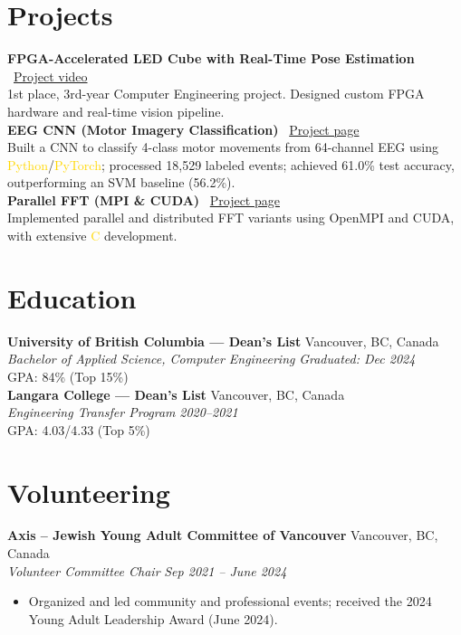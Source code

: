 \documentclass[11pt]{article}
\newcommand{\gold}[1]{\textcolor{gold}{#1}}
\newcommand{\resumeItem}[1]{\item\small{#1}}
\newcommand{\resumeSubheading}[4]{%
  \textbf{#1} \hfill #2\\
  \textit{#3} \hfill \textit{#4}\\
}
\begin{document}
\section{Projects}
\textbf{FPGA-Accelerated LED Cube with Real-Time Pose Estimation} \textbar\ \href{https://www.youtube.com/watch?v=kbrSmiwQhu4&ab_channel=AdinMauer}{Project video}\\
1st place, 3rd-year Computer Engineering project. Designed custom FPGA hardware and real-time vision pipeline.\\
\textbf{EEG CNN (Motor Imagery Classification)} \textbar\ \href{https://mauer4.github.io/project/eeg_cnn/}{Project page}\\
Built a CNN to classify 4-class motor movements from 64-channel EEG using \gold{Python}/\gold{PyTorch}; processed 18,529 labeled events; achieved 61.0\% test accuracy, outperforming an SVM baseline (56.2\%).\\
\textbf{Parallel FFT (MPI \& CUDA)} \textbar\ \href{https://mauer4.github.io/project/parallel_fft/}{Project page}\\
Implemented parallel and distributed FFT variants using OpenMPI and CUDA, with extensive \gold{C} development.

\section{Education}
\resumeSubheading{University of British Columbia --- Dean's List}{Vancouver, BC, Canada}{Bachelor of Applied Science, Computer Engineering}{Graduated: Dec 2024}
GPA: 84\% (Top 15\%)\\
\resumeSubheading{Langara College --- Dean's List}{Vancouver, BC, Canada}{Engineering Transfer Program}{2020--2021}
GPA: 4.03/4.33 (Top 5\%)

\section{Volunteering}
\resumeSubheading{Axis -- Jewish Young Adult Committee of Vancouver}{Vancouver, BC, Canada}{Volunteer Committee Chair}{Sep 2021 -- June 2024}
\vspace{-6pt}
\begin{itemize}[leftmargin=*]
  \resumeItem{Organized and led community and professional events; received the 2024 Young Adult Leadership Award (June 2024).}
\end{itemize}
\end{document}
